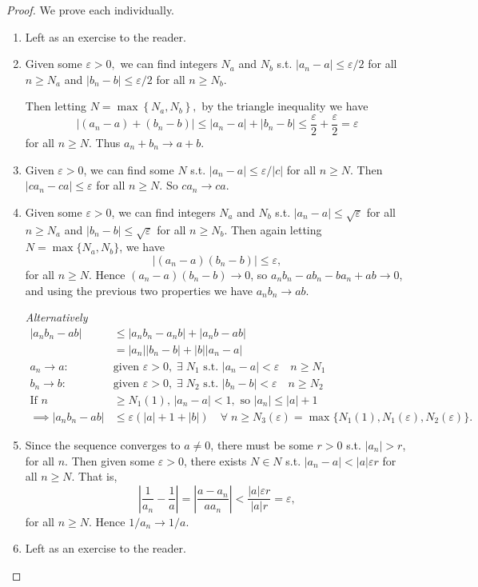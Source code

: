 \begin{proof}
	We prove each individually.
	\begin{enumerate}[label=(\roman*)]
		\item Left as an exercise to the reader.
		\item Given some $\varepsilon>0,$ we can find integers $N_{a}$ and $N_{b}$ s.t. $|a_n - a| \leq \varepsilon/2$ for all $n \geq N_a$ and $|b_n - b| \leq \varepsilon/2$ for all $n \geq N_b$.
		
		Then letting $N=\max \left\{N_{a}, N_{b}\right\},$ by the triangle inequality we have
		$$
			\left|\left(a_{n}-a\right)+\left(b_{n}-b\right)\right| \leq\left|a_{n}-a\right|+\left|b_{n}-b\right|
			\leq \frac{\varepsilon}{2}+\frac{\varepsilon}{2}=\varepsilon
		$$
		for all $n \geq N$. Thus $a_{n}+b_{n} \rightarrow a+b$.
		\item Given $\varepsilon > 0$, we can find some $N$ s.t.
		$|a_n - a| \leq \varepsilon/|c|$ for all $n \geq N$. Then $|ca_n - ca| \leq \varepsilon$ for all $n \geq N$. So $c a_n \rightarrow c a$.
		\item Given some $\varepsilon > 0$, we can find integers $N_a$ and $N_b$ s.t. $|a_n - a| \leq \sqrt{\varepsilon}$ for all $n \geq N_a$ and $|b_n - b| \leq \sqrt{\varepsilon}$ for all $n \geq N_b$. Then again letting $N = \max\{N_a, N_b\}$, we have
		$$
			|(a_n - a)(b_n - b)| \leq \varepsilon,
		$$
		for all $n \geq N$.
		Hence $(a_n - a)(b_n - b) \rightarrow 0$, so $a_n b_n - a b_n - b a_n + ab \rightarrow 0$, and using the previous two properties we have $a_n b_n \rightarrow ab$.

		\emph{Alternatively} 
		\begin{align*}
			|a_n b_n - ab| &\leq |a_n b_n - a_n b| + |a_n b - ab| \\
			&= |a_n||b_n - b| + |b| |a_n - a| \\
			a_n \to a: \; &\text{given } \varepsilon > 0,\; \exists \; N_1 \text{ s.t. } |a_n - a| < \varepsilon \quad n \geq N_1 \\
			b_n \to b: \;&\text{given } \varepsilon > 0,\; \exists \; N_2 \text{ s.t. } |b_n - b| < \varepsilon \quad n \geq N_2 \\
			\text{If } n &\geq N_1(1),\, |a_n - a| < 1, \text{ so } |a_n| \leq |a| + 1 \\
			\implies |a_n b_n - ab| &\leq \varepsilon (|a| + 1 + |b|) \quad \forall \; n \geq N_3(\varepsilon) = \max \{N_1(1), N_1(\varepsilon), N_2(\varepsilon) \}.
		\end{align*} 
		\item Since the sequence converges to $a \neq 0$, there must be some $r>0$ s.t. $|a_n|>r$, for all $n$.
		Then given some $\varepsilon > 0$, there exists $N \in N$ s.t. $|a_n - a| < |a|\varepsilon r$ for all $n \geq N$. That is,
		$$
		\left|\frac{1}{a_n} - \frac{1}{a}\right|=\left|\frac{a - a_n}{a a_n}\right| < \frac{|a|\varepsilon r}{|a|r} = \varepsilon,
		$$
		for all $n \geq N$.
		Hence $1/a_n \rightarrow 1/a$.
		\item Left as an exercise to the reader. \qedhere
	\end{enumerate}
\end{proof}

